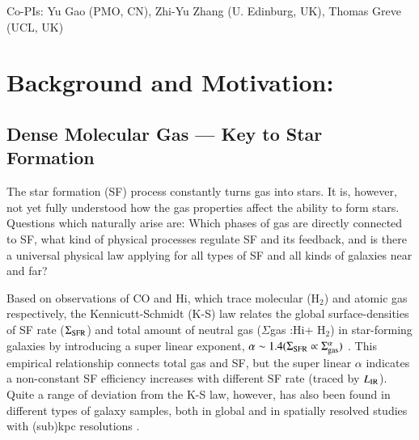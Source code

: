 \documentclass[legal,11pt]{article}
\def\HI{H{\sc i}}
\def\Htwo{H$_2$}
\def\LIR     {$L_{\rm IR}$}
\def\Htwo       {H$_2$}
\begin{document}
\begin{table}[htbp]
\begin{threeparttable}[b]
\begin{tabular}{lcclcc}
\hline
\end{tabular}
 
\begin{tablenotes}
Co-PIs: Yu Gao (PMO, CN), Zhi-Yu Zhang (U. Edinburg, UK), Thomas Greve (UCL, UK)\\
\end{tablenotes}
\end{threeparttable}

\end{table}



\clearpage
\justify
\medskip


\section{Background and Motivation:}

\subsection{Dense Molecular Gas --- Key to Star Formation }


The star formation (SF) process constantly turns gas into stars. It is,
however, not yet fully understood how the gas properties affect the ability to
form stars. Questions which naturally arise are: Which phases of gas are
directly connected to SF, what kind of physical processes regulate SF and its
feedback, and is there a universal physical law applying for all types of SF
and all kinds of galaxies near and far?   


Based on observations of CO and \HI, which trace molecular (\Htwo) and atomic
gas respectively, the Kennicutt-Schmidt (K-S) law relates the global
surface-densities of SF rate ($\Sigma_{\rm SFR}$) and total amount of neutral
gas ($\Sigma$gas :\HI + \Htwo) in star-forming galaxies by introducing a super
linear exponent, $\alpha \sim 1.4 (\Sigma_{\rm SFR} \propto \Sigma_{\rm
gas}^\alpha)$ \citep{Kennicutt2012}. This empirical relationship connects total
gas and SF, but the super linear $\alpha$ indicates a non-constant SF
efficiency increases with  different SF rate (traced by \LIR). Quite a range of
deviation from the K-S law, however, has also been found in different types of
galaxy samples, both in global and in spatially resolved studies with (sub)kpc
resolutions \citep[e.g., see Fig.  \ref{bigiel08}][]{Kennicutt2012,Bigiel2008}.  
\end{document}
